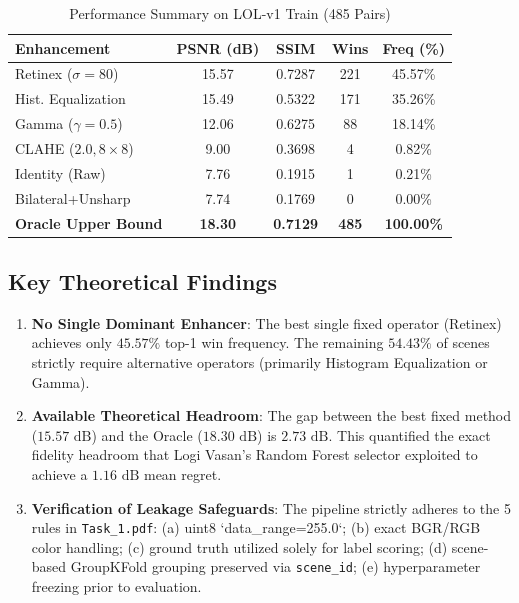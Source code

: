 \documentclass[journal]{IEEEtran}
\begin{document}
\begin{table}[!h]
\centering
\setlength{\tabcolsep}{3.2pt}
\caption{Performance Summary on LOL-v1 Train (485 Pairs)}
\label{tab:scores_summary}
\begin{tabular}{lcccc}
\toprule
\textbf{Enhancement} & \textbf{PSNR (dB)} & \textbf{SSIM} & \textbf{Wins} & \textbf{Freq (\%)} \\
\midrule
Retinex ($\sigma=80$) & 15.57 & 0.7287 & 221 & 45.57\% \\
Hist. Equalization & 15.49 & 0.5322 & 171 & 35.26\% \\
Gamma ($\gamma=0.5$) & 12.06 & 0.6275 & 88 & 18.14\% \\
CLAHE ($2.0, 8\times 8$) & 9.00 & 0.3698 & 4 & 0.82\% \\
Identity (Raw) & 7.76 & 0.1915 & 1 & 0.21\% \\
Bilateral+Unsharp & 7.74 & 0.1769 & 0 & 0.00\% \\
\midrule
\textbf{Oracle Upper Bound} & \textbf{18.30} & \textbf{0.7129} & \textbf{485} & \textbf{100.00\%} \\
\bottomrule
\end{tabular}
\end{table}

\subsection{Key Theoretical Findings}
\begin{enumerate}
    \item \textbf{No Single Dominant Enhancer}: The best single fixed operator (Retinex) achieves only $45.57\%$ top-1 win frequency. The remaining $54.43\%$ of scenes strictly require alternative operators (primarily Histogram Equalization or Gamma).
    \item \textbf{Available Theoretical Headroom}: The gap between the best fixed method ($15.57\text{ dB}$) and the Oracle ($18.30\text{ dB}$) is \textbf{$2.73\text{ dB}$}. This quantified the exact fidelity headroom that Logi Vasan's Random Forest selector exploited to achieve a $1.16\text{ dB}$ mean regret.
    \item \textbf{Verification of Leakage Safeguards}: The pipeline strictly adheres to the 5 rules in \texttt{Task\_1.pdf}: (a) uint8 `data\_range=255.0`; (b) exact BGR/RGB color handling; (c) ground truth utilized solely for label scoring; (d) scene-based GroupKFold grouping preserved via \texttt{scene\_id}; (e) hyperparameter freezing prior to evaluation.
\end{enumerate}
\end{document}
